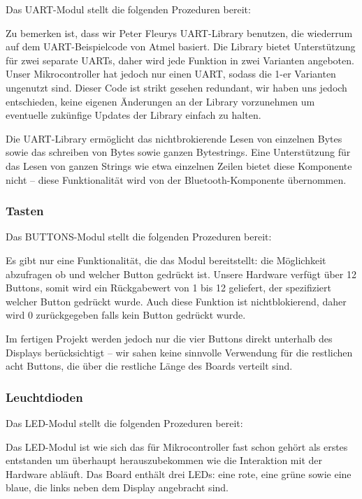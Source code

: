 \documentclass[ngerman]{article}
\begin{document}
Das UART-Modul stellt die folgenden Prozeduren bereit:



Zu bemerken ist, dass wir Peter Fleurys UART-Library benutzen, die wiederrum
auf dem UART-Beispielcode von Atmel basiert. Die Library bietet Unterstützung
für zwei separate UARTs, daher wird jede Funktion in zwei Varianten angeboten.
Unser Mikrocontroller hat jedoch nur einen UART, sodass die 1-er Varianten
ungenutzt sind. Dieser Code ist strikt gesehen redundant, wir haben uns jedoch
entschieden, keine eigenen Änderungen an der Library vorzunehmen um eventuelle
zukünfige Updates der Library einfach zu halten.

Die UART-Library ermöglicht das nichtbrokierende Lesen von einzelnen Bytes
sowie das schreiben von Bytes sowie ganzen Bytestrings. Eine Unterstützung für
das Lesen von ganzen Strings wie etwa einzelnen Zeilen bietet diese Komponente
nicht -- diese Funktionalität wird von der Bluetooth-Komponente übernommen.

\subsubsection{Tasten}

Das BUTTONS-Modul stellt die folgenden Prozeduren bereit:



Es gibt nur eine Funktionalität, die das Modul bereitstellt: die Möglichkeit
abzufragen ob und welcher Button gedrückt ist. Unsere Hardware verfügt über 12
Buttons, somit wird ein Rückgabewert von 1 bis 12 geliefert, der spezifiziert
welcher Button gedrückt wurde. Auch diese Funktion ist nichtblokierend, daher
wird 0 zurückgegeben falls kein Button gedrückt wurde.

Im fertigen Projekt werden jedoch nur die vier Buttons direkt unterhalb des
Displays berücksichtigt -- wir sahen keine sinnvolle Verwendung für die
restlichen acht Buttons, die über die restliche Länge des Boards verteilt sind.

\subsubsection{Leuchtdioden}

Das LED-Modul stellt die folgenden Prozeduren bereit:



Das LED-Modul ist wie sich das für Mikrocontroller fast schon gehört als
erstes entstanden um überhaupt herauszubekommen wie die Interaktion mit
der Hardware abläuft. Das Board enthält drei LEDs: eine rote, eine grüne
sowie eine blaue, die links neben dem Display angebracht sind.
\end{document}
